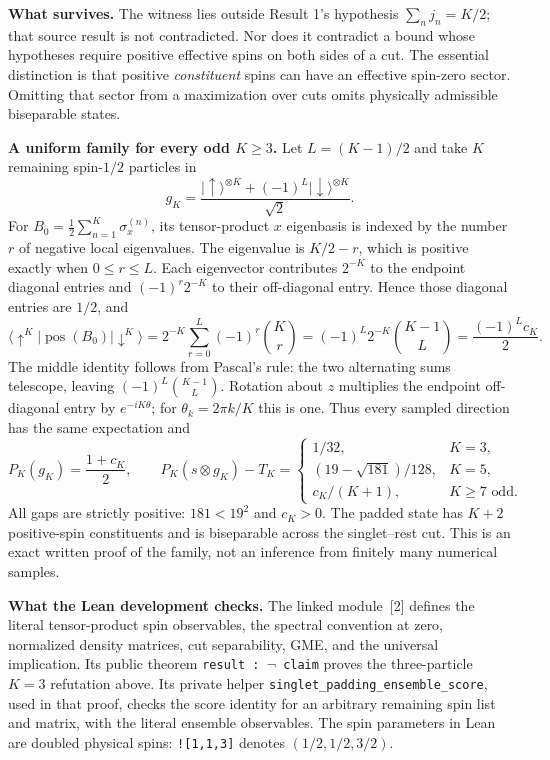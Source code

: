 \documentclass[11pt,a4paper]{article}
\newcommand{\pos}{\operatorname{pos}}
\newcommand{\ket}[1]{\lvert #1\rangle}
\newcommand{\bra}[1]{\langle #1\rvert}
\begin{document}
\textbf{What survives.}
The witness lies outside Result 1's hypothesis $\sum_n j_n=K/2$;
that source result is not contradicted. Nor does it contradict a bound
whose hypotheses require positive effective spins on both sides of a cut.
The essential distinction is that positive \emph{constituent} spins
can have an effective spin-zero sector. Omitting that sector from a
maximization over cuts omits physically admissible biseparable states.

\newpage
\textbf{A uniform family for every odd $K\geq3$.}
Let $L=(K-1)/2$ and take $K$ remaining spin-$1/2$ particles in
\[
g_K=\frac{\ket{\uparrow}^{\otimes K}+(-1)^L
\ket{\downarrow}^{\otimes K}}{\sqrt2}.
\]
For $B_0=\frac12\sum_{n=1}^{K}\sigma_x^{(n)}$, its tensor-product
$x$ eigenbasis is indexed by the number $r$ of negative local eigenvalues.
The eigenvalue is $K/2-r$, which is positive exactly when $0\leq r\leq L$.
Each eigenvector contributes $2^{-K}$ to the endpoint diagonal entries
and $(-1)^r2^{-K}$ to their off-diagonal entry. Hence those diagonal
entries are $1/2$, and
\[
\bra{\uparrow^K}\pos(B_0)\ket{\downarrow^K}
=2^{-K}\sum_{r=0}^{L}(-1)^r\binom Kr
=(-1)^L2^{-K}\binom{K-1}{L}
=\frac{(-1)^L c_K}{2}.
\]
The middle identity follows from Pascal's rule: the two alternating
sums telescope, leaving $(-1)^L\binom{K-1}{L}$.
Rotation about $z$ multiplies the endpoint off-diagonal entry by
$e^{-iK\theta}$; for $\theta_k=2\pi k/K$ this is one.
Thus every sampled direction has the same expectation and
\[
P_K(g_K)=\frac{1+c_K}{2},\qquad
P_K(s\otimes g_K)-T_K=
\begin{cases}
1/32,&K=3,\\
(19-\sqrt{181})/128,&K=5,\\
c_K/(K+1),&K\geq7\text{ odd}.
\end{cases}
\]
All gaps are strictly positive: $181<19^2$ and $c_K>0$.
The padded state has $K+2$ positive-spin constituents and is biseparable
across the singlet--rest cut. This is an exact written proof of the family,
not an inference from finitely many numerical samples.

\textbf{What the Lean development checks.}
The linked module~[2] defines the literal tensor-product spin observables,
the spectral convention at zero, normalized density matrices,
cut separability, GME, and the universal implication. Its public theorem
\texttt{result : $\neg$ claim} proves the three-particle $K=3$ refutation above.
Its private helper \texttt{singlet\_padding\_ensemble\_score}, used in that
proof, checks the score identity for an arbitrary remaining spin list and
matrix, with the literal ensemble observables. The spin parameters in
Lean are doubled physical spins: \texttt{![1,1,3]} denotes
$(1/2,1/2,3/2)$.
\end{document}
